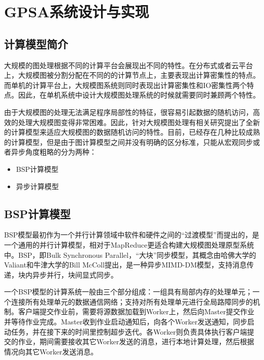 
\chapter{GPSA系统设计与实现}

\section{计算模型简介}
大规模的图处理根据不同的计算平台会展现出不同的特性。在分布式或者云平台上，大规模图被分割分配在不同的的计算节点上，主要表现出计算密集性的特点。而单机的计算平台上，大规模图系统则同时表现出计算密集性和IO密集性两个特点。因此，在单机系统中设计大规模图处理系统的时候就需要同时兼顾两个特性。

由于大规模图的处理无法满足程序局部性的特征，很容易引起数据的随机访问，高效的处理大规模图变得非常困难。因此，针对大规模图处理有相关研究提出了全新的计算模型来适应大规模图的数据随机访问的特性。目前，已经存在几种比较成熟的计算模型，但是由于图计算模型之间并没有明确的区分标准，只能从宏观同步或者异步角度粗略的分为两种：

\begin{itemize}
\item BSP计算模型
\item 异步计算模型
\end{itemize}

\section{BSP计算模型}

BSP模型最初作为一个并行计算领域中软件和硬件之间的“过渡模型”而提出的，是一个通用的并行计算模型，相对于MapReduce更适合构建大规模图处理原型系统中。BSP，即Bulk Synchronous Parallel，“大块”同步模型，其概念由哈佛大学的Valiant和牛津大学的Bill McColl提出，是一种异步MIMD-DM模型，支持消息传递，块内异步并行，块间显式同步。

一个BSP模型的计算系统一般由三个部分组成：一组具有局部内存的处理单元；一个连接所有处理单元的数据通信网络；支持对所有处理单元进行全局路障同步的机制。客户端提交作业前，需要将源数据加载到Worker上，然后向Master提交作业并等待作业完成。Master收到作业启动通知后，向各个Worker发送通知，同步启动任务，并在接下来的时间里控制超步迭代。各Worker则负责具体执行客户端提交的作业，期间需要接收其它Worker发送的消息，进行本地计算处理，然后根据情况向其它Worker发送消息。


